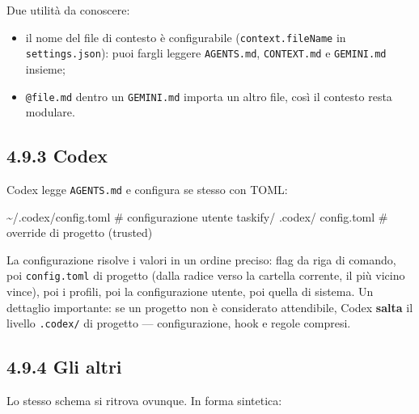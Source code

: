 \documentclass[
  italian,
  10pt,
]{book}
\newenvironment{Shaded}{\begin{snugshade}}{\end{snugshade}}
\newcommand{\NormalTok}[1]{#1}
\providecommand{\tightlist}{%
  \setlength{\itemsep}{0pt}\setlength{\parskip}{0pt}}
\begin{document}
Due utilità da conoscere:

\begin{itemize}
\tightlist
\item
  il nome del file di contesto è configurabile
  (\texttt{context.fileName} in \texttt{settings.json}): puoi fargli
  leggere \texttt{AGENTS.md}, \texttt{CONTEXT.md} e \texttt{GEMINI.md}
  insieme;
\item
  \texttt{@file.md} dentro un \texttt{GEMINI.md} importa un altro file,
  così il contesto resta modulare.
\end{itemize}

\subsection{4.9.3 Codex}\label{codex}

Codex legge \texttt{AGENTS.md} e configura se stesso con TOML:

\begin{Shaded}
\begin{Highlighting}[]
\NormalTok{\textasciitilde{}/.codex/config.toml          \# configurazione utente}
\NormalTok{taskify/}
\NormalTok{\textasciigrave{}{-}{-} .codex/}
\NormalTok{    \textasciigrave{}{-}{-} config.toml           \# override di progetto (trusted)}
\end{Highlighting}
\end{Shaded}

La configurazione risolve i valori in un ordine preciso: flag da riga di
comando, poi \texttt{config.toml} di progetto (dalla radice verso la
cartella corrente, il più vicino vince), poi i profili, poi la
configurazione utente, poi quella di sistema. Un dettaglio importante:
se un progetto non è considerato attendibile, Codex \textbf{salta} il
livello \texttt{.codex/} di progetto --- configurazione, hook e regole
compresi.

\subsection{4.9.4 Gli altri}\label{gli-altri}

Lo stesso schema si ritrova ovunque. In forma sintetica:
\end{document}
